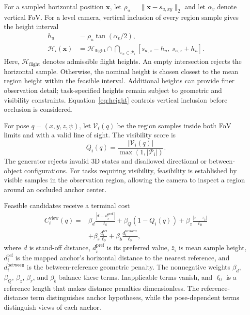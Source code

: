 \documentclass[letterpaper,10pt,journal]{IEEEtran}
\begin{document}
For a sampled horizontal position $\bm x$, let $\rho_u=\|\bm x-s_{u,xy}\|_2$ and let $\alpha_v$ denote vertical FoV. For a level camera, vertical inclusion of every region sample gives the height interval
\begin{equation}
\begin{aligned}
h_u&=\rho_u\tan(\alpha_v/2),\\
\mathcal H_i(\bm x)&=\mathcal H_{\mathrm{flight}}\cap
\bigcap_{s_u\in\mathcal P_i}[s_{u,z}-h_u,\ s_{u,z}+h_u].
\end{aligned}
\label{eq:height}
\end{equation}
Here, $\mathcal H_{\mathrm{flight}}$ denotes admissible flight heights. An empty intersection rejects the horizontal sample. Otherwise, the nominal height is chosen closest to the mean region height within the feasible interval. Additional heights can provide finer observation detail; task-specified heights remain subject to geometric and visibility constraints. Equation~\ref{eq:height} controls vertical inclusion before occlusion is considered.

For pose $q=(x,y,z,\psi)$, let $\mathcal V_i(q)$ be the region samples inside both FoV limits and with a valid line of sight. The visibility score is
\begin{equation}
Q_i(q)=\frac{|\mathcal V_i(q)|}{\max(1,|\mathcal P_i|)}.
\label{eq:visibility}
\end{equation}
The generator rejects invalid 3D states and disallowed directional or between-object configurations. For tasks requiring visibility, feasibility is established by visible samples in the observation region, allowing the camera to inspect a region around an occluded anchor center.

Feasible candidates receive a terminal cost
\begin{equation}
\begin{aligned}
C_i^{\mathrm{view}}(q)={}&\beta_d\frac{|d-d_i^{\mathrm{pref}}|}{\ell_0}
+\beta_Q(1-Q_i(q))
+\beta_z\frac{|z-\bar z_i|}{\ell_0}\\
&+\beta_r\frac{d_i^{\mathrm{ref}}}{\ell_0}
+\beta_b\frac{d_i^{\mathrm{between}}}{\ell_0},
\end{aligned}
\label{eq:view-cost}
\end{equation}
where $d$ is stand-off distance, $d_i^{\mathrm{pref}}$ is its preferred value, $\bar z_i$ is mean sample height, $d_i^{\mathrm{ref}}$ is the mapped anchor's horizontal distance to the nearest reference, and $d_i^{\mathrm{between}}$ is the between-reference geometric penalty. The nonnegative weights $\beta_d$, $\beta_Q$, $\beta_z$, $\beta_r$, and $\beta_b$ balance these terms. Inapplicable terms vanish, and $\ell_0$ is a reference length that makes distance penalties dimensionless. The reference-distance term distinguishes anchor hypotheses, while the pose-dependent terms distinguish views of each anchor.
\end{document}
